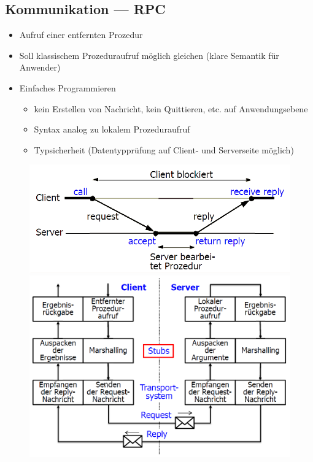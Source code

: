 \documentclass[10pt,a4paper]{article}
\begin{document}
\subsection{Kommunikation --- RPC}
\begin{itemize}
\item Aufruf einer entfernten Prozedur
\item Soll klassischem Prozeduraufruf möglich gleichen (klare Semantik für Anwender)
\item Einfaches Programmieren
\begin{itemize}
\item kein Erstellen von Nachricht, kein Quittieren, etc. auf Anwendungsebene
\item Syntax analog zu lokalem Prozeduraufruf
\item Typsicherheit (Datentypprüfung auf Client- und Serverseite möglich)
\end{itemize}
\end{itemize}
\begin{figure}[h]
\includegraphics[scale=0.33]{./Bilder/RPC}
\includegraphics[scale=0.25]{./Bilder/RPC_Implementierung}
\end{figure}
\end{document}
